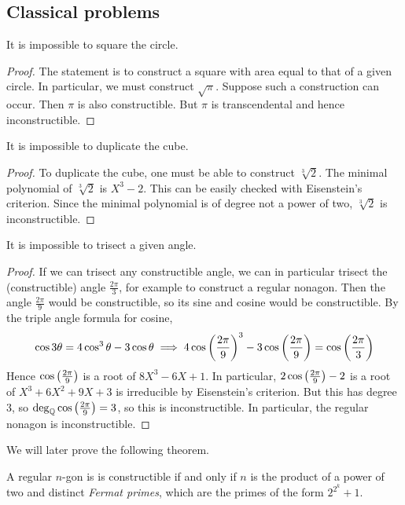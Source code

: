 \subsection{Classical problems}
\begin{theorem}
	It is impossible to square the circle.
\end{theorem}
\begin{proof}
	The statement is to construct a square with area equal to that of a given circle.
	In particular, we must construct \( \sqrt \pi \).
	Suppose such a construction can occur.
	Then \( \pi \) is also constructible.
	But \( \pi \) is transcendental and hence inconstructible.
\end{proof}
\begin{theorem}
	It is impossible to duplicate the cube.
\end{theorem}
\begin{proof}
	To duplicate the cube, one must be able to construct \( \sqrt[3]{2} \).
	The minimal polynomial of \( \sqrt[3]{2} \) is \( X^3 - 2 \).
	This can be easily checked with Eisenstein's criterion.
	Since the minimal polynomial is of degree not a power of two, \( \sqrt[3]{2} \) is inconstructible.
\end{proof}
\begin{theorem}
	It is impossible to trisect a given angle.
\end{theorem}
\begin{proof}
	If we can trisect any constructible angle, we can in particular trisect the (constructible) angle \( \frac{2\pi}{3} \), for example to construct a regular nonagon.
	Then the angle \( \frac{2\pi}{9} \) would be constructible, so its sine and cosine would be constructible.
	By the triple angle formula for cosine,
	\[ \cos 3\theta = 4\cos^3 \theta - 3 \cos\theta \implies 4\cos\qty(\frac{2\pi}{9})^3 - 3\cos\qty(\frac{2\pi}{9}) = \cos\qty(\frac{2\pi}{3}) \]
	Hence \( \cos\qty(\frac{2\pi}{9}) \) is a root of \( 8X^3 - 6X + 1 \).
	In particular, \( 2\cos\qty(\frac{2\pi}{9}) - 2 \) is a root of \( X^3 + 6X^2 + 9X + 3 \) is irreducible by Eisenstein's criterion.
	But this has degree 3, so \( \deg_{\mathbb Q} \cos \qty(\frac{2\pi}{9}) = 3 \), so this is inconstructible.
	In particular, the regular nonagon is inconstructible.
\end{proof}
We will later prove the following theorem.
\begin{theorem}[Gauss]
	A regular \( n \)-gon is is constructible if and only if \( n \) is the product of a power of two and distinct \emph{Fermat primes}, which are the primes of the form \( 2^{2^k} + 1 \).
\end{theorem}

